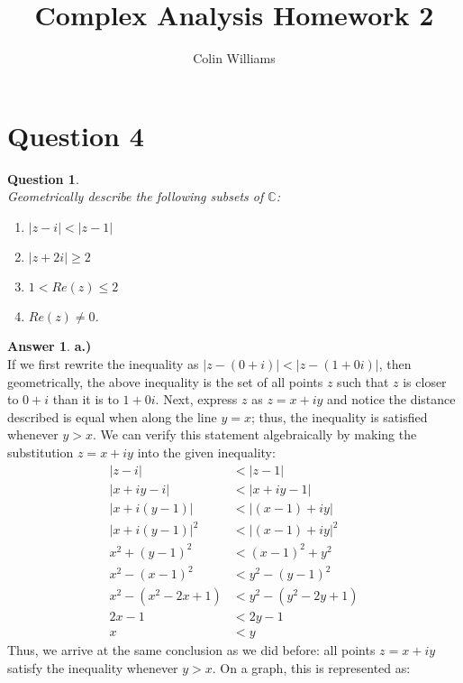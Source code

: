 \documentclass[10pt,a4paper]{article}
\title{Complex Analysis Homework 2}
\author{Colin Williams}
\newtheorem*{question*}{Question}
\theoremstyle{definition}
\newtheorem*{answer*}{Answer}
\begin{document}
\maketitle
\section*{Question 4}
\begin{question*}{$ $}
\\Geometrically describe the following subsets of $\mathbb{C}$:
\begin{enumerate}[label = \alph*.)]
\item $|z - i| < |z - 1|$
\item $|z + 2i| \geq 2$
\item $1 < Re(z) \leq 2$
\item $Re(z) \neq 0$.
\end{enumerate}
\end{question*}

\begin{answer*}{\textbf{a.)}}
\\If we first rewrite the inequality as $|z - (0 + i)| < |z - (1 + 0i)|$, then geometrically, the above inequality is the set of all points $z$ such that $z$ is closer to $0 + i$ than it is to $1 + 0i$. Next, express $z$ as $z = x + iy$ and notice the distance described is equal when along the line $y = x$; thus, the inequality is satisfied whenever $y > x$. We can verify this statement algebraically by making the substitution $z = x + iy$ into the given inequality:
\begin{align*}
|z - i| &< |z - 1|\\
|x + iy - i| &< |x + iy - 1|\\
|x + i(y - 1)| &< |(x - 1) + iy|\\
|x + i(y - 1)|^2 &< |(x - 1) + iy|^2\\
x^2 + (y-1)^2 &< (x-1)^2 + y^2\\
x^2 - (x-1)^2 &< y^2 - (y-1)^2\\
x^2 - (x^2 - 2x +1) &< y^2 - (y^2 - 2y +1)\\
2x - 1 &< 2y - 1\\
x &< y
\end{align*}
Thus, we arrive at the same conclusion as we did before: all points $z = x + iy$ satisfy the inequality whenever $y > x$. On a graph, this is represented as:


\end{answer*}
\end{document}

